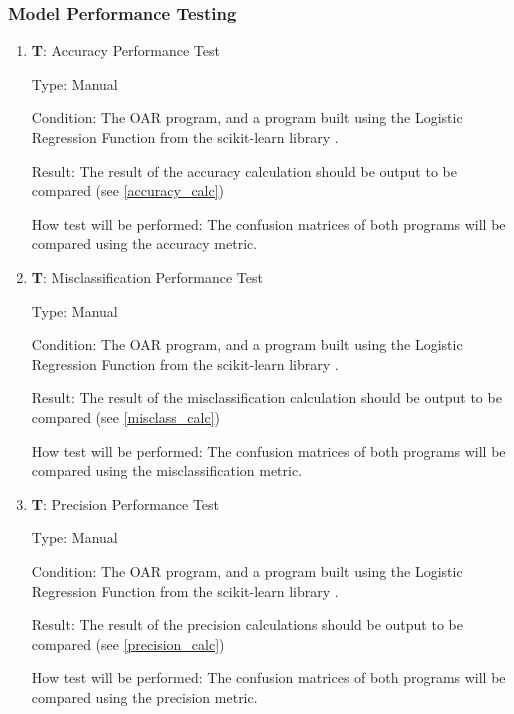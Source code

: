 \documentclass[12pt, titlepage]{article}
\newcounter{testnum} %
\begin{document}
\subsubsection{Model Performance Testing}

\begin{enumerate}

  \item{\textbf{T\thetestnum \label{T_accuracy}}: Accuracy Performance Test\\}

  Type: Manual
            
  Condition: The OAR program, and a program built
  using the Logistic Regression Function from the scikit-learn library \citep{SKLearn}.
            
  Result: The result of the accuracy calculation should be output to be compared (see \ref{accuracy_calc})
            
  How test will be performed: The confusion matrices of both programs will be compared using the accuracy metric.

  \item{\textbf{T\thetestnum \label{T_misclass}}: Misclassification Performance Test\\}

  Type: Manual
            
  Condition: The OAR program, and a program built
  using the Logistic Regression Function from the scikit-learn library \citep{SKLearn}.
            
  Result: The result of the misclassification calculation should be output to be compared (see \ref{misclass_calc})
            
  How test will be performed: The confusion matrices of both programs will be compared using the misclassification metric.

  \item{\textbf{T\thetestnum \label{T_precision}}: Precision Performance Test\\}

  Type: Manual
            
  Condition: The OAR program, and a program built
  using the Logistic Regression Function from the scikit-learn library \citep{SKLearn}.
            
  Result: The result of the precision calculations should be output to be compared (see \ref{precision_calc})
            
  How test will be performed: The confusion matrices of both programs will be compared using the precision metric.
\end{enumerate} 
					
\end{document}
